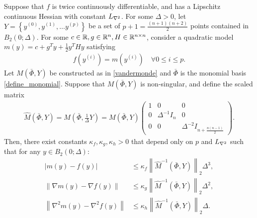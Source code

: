\begin{theorem}
\label{3_16_replacement}
Suppose that $f$ is twice continuously differentiable, and has a Lipschitz continuous Hessian with constant ${L_{\nabla^2}}$.
For some $\Delta > 0$, let $Y = \left\{y^{(0)}, y^{(1)}, \ldots y^{(p)} \right\}$ be a set of
$p+1=\frac{(n+1)(n+2)}{2}$ points contained in $B_2\left(0; \Delta\right)$.
For some $c \in \mathbb R, g \in \mathbb R^n, H \in \mathbb R^{n \times n}$, consider a quadratic model $m(y) = c + g^T y + \frac 1 2 y^T H y$  satisfying
\begin{align}
f\left(y^{(i)}\right) = m\left(y^{(i)}\right) \quad \forall 0 \le i \le p. \label{nce_interpolation_condition}
\end{align}
Let $M(\bar \Phi,Y)$ be constructed as in \cref{vandermonde} and $\bar \Phi$ is the monomial basis \cref{define_monomial}.
Suppose that $M(\bar \Phi,Y)$ is non-singular, and define the scaled matrix
\begin{align}
\hat M\left(\bar \Phi, Y\right) = M\left(\bar \Phi, \frac 1 {\Delta} Y\right) = M\left(\bar \Phi,Y\right) \begin{pmatrix}
1 & 0 & 0 \\
0 & \Delta^{-1} I_n & 0 \\
0 & 0 & \Delta^{-2} I_{n + \frac{n(n-1)}{2}}
\end{pmatrix}. \label{nce_scale}
\end{align}
Then, there exist constants $\kappa_f, \kappa_g, \kappa_h>0$ that depend only on $p$ and ${L_{\nabla^2}}$ such that
for any $y \in B_2\left(0; \Delta\right)$:
\begin{align}
\left|m(y) - f(y)\right| &\le \kappa_f \left\|\hat M^{-1}(\bar \Phi, Y) \right\|_2 \Delta^3, \label{error_in_function}  \\
\left\|\nabla m(y) - \nabla f(y)\right\| &\le \kappa_g \left\|\hat M^{-1}(\bar \Phi, Y) \right\|_2\Delta^2, \label{error_in_gradient} \\
\left\|\nabla^2 m(y) - \nabla^2 f(y)\right\| &\le \kappa_h \left\|\hat M^{-1}(\bar \Phi, Y) \right\|_2\Delta. \label{error_in_hessian}
\end{align}
\end{theorem}


